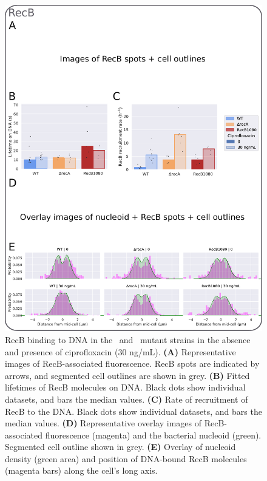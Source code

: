 \begin{figure}[htbp]
    \centering
    \includegraphics[width=.75\textwidth]{Figures/Fig4_mutants.pdf}
    \caption{RecB binding to DNA in the \dreca\ and \teneighty\ mutant strains in the absence and presence of ciprofloxacin (30 ng/mL). \textbf{(A)} Representative images of RecB-associated fluorescence. RecB spots are indicated by arrows, and segmented cell outlines are shown in grey. \textbf{(B)} Fitted lifetimes of RecB molecules on DNA. Black dots show individual datasets, and bars the median values. \textbf{(C)} Rate of recruitment of RecB to the DNA. Black dots show individual datasets, and bars the median values. \textbf{(D)} Representative overlay images of RecB-associated fluorescence (magenta) and the bacterial nucleoid (green). Segmented cell outline shown in grey. \textbf{(E)} Overlay of nucleoid density (green area) and position of DNA-bound RecB molecules (magenta bars) along the cell's long axis.}
    \label{Fig:mutants}
\end{figure}

